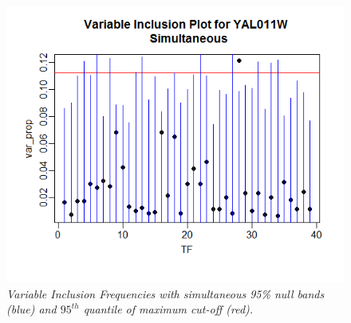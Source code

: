 \documentclass[12pt]{article}
\begin{document}
\begin{figure}[H]
\centerline{\includegraphics[scale=.5]{gene10s}}
\caption{\it Variable Inclusion Frequencies with simultaneous 95\% null bands (blue) and $95^{th}$ quantile of maximum cut-off (red).}\label{fig:f1}  
\end{figure}
\end{document}
